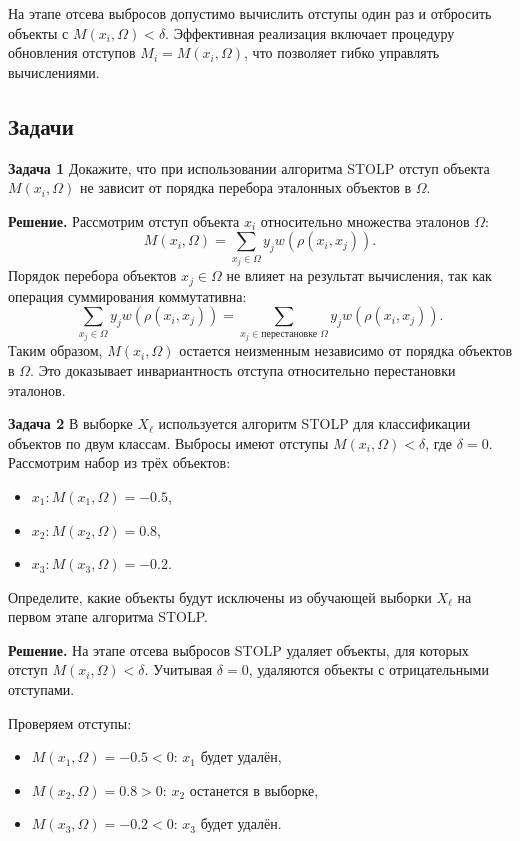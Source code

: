 На этапе отсева выбросов допустимо вычислить отступы один раз и отбросить объекты с \( M(x_i, \Omega) < \delta \). Эффективная реализация включает процедуру обновления отступов \( M_i = M(x_i, \Omega) \), что позволяет гибко управлять вычислениями.

\subsection*{Задачи}

\textbf{Задача 1}
Докажите, что при использовании алгоритма STOLP отступ объекта \(M(x_i, \Omega)\) не зависит от порядка перебора эталонных объектов в \( \Omega \).

\textbf{Решение.}  
Рассмотрим отступ объекта \(x_i\) относительно множества эталонов \( \Omega \):
\[
M(x_i, \Omega) = \sum_{x_j \in \Omega} y_j w(\rho(x_i, x_j)).
\]
Порядок перебора объектов \(x_j \in \Omega\) не влияет на результат вычисления, так как операция суммирования коммутативна:
\[
\sum_{x_j \in \Omega} y_j w(\rho(x_i, x_j)) = \sum_{x_j \in \text{перестановке } \Omega} y_j w(\rho(x_i, x_j)).
\]
Таким образом, \(M(x_i, \Omega)\) остается неизменным независимо от порядка объектов в \( \Omega \). Это доказывает инвариантность отступа относительно перестановки эталонов.

\textbf{Задача 2}
В выборке \(X_\ell\) используется алгоритм STOLP для классификации объектов по двум классам. Выбросы имеют отступы \(M(x_i, \Omega) < \delta\), где \(\delta = 0\). Рассмотрим набор из трёх объектов:  
\begin{itemize}
    \item \(x_1: M(x_1, \Omega) = -0.5\),  
    \item \(x_2: M(x_2, \Omega) = 0.8\),  
    \item \(x_3: M(x_3, \Omega) = -0.2\).
\end{itemize}  
Определите, какие объекты будут исключены из обучающей выборки \(X_\ell\) на первом этапе алгоритма STOLP.

\textbf{Решение.}  
На этапе отсева выбросов STOLP удаляет объекты, для которых отступ \(M(x_i, \Omega) < \delta\). Учитывая \(\delta = 0\), удаляются объекты с отрицательными отступами.  

Проверяем отступы:  
\begin{itemize}
    \item \(M(x_1, \Omega) = -0.5 < 0\): \(x_1\) будет удалён,  
    \item \(M(x_2, \Omega) = 0.8 > 0\): \(x_2\) останется в выборке,  
    \item \(M(x_3, \Omega) = -0.2 < 0\): \(x_3\) будет удалён.  
\end{itemize}

